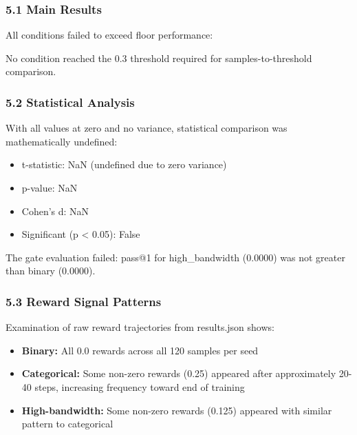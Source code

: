 
\subsubsection{5.1 Main Results}

All conditions failed to exceed floor performance:

\begin{table}[htbp]
\centering
{}
\end{table}

No condition reached the 0.3 threshold required for samples-to-threshold comparison.

\subsubsection{5.2 Statistical Analysis}

With all values at zero and no variance, statistical comparison was mathematically undefined:

\begin{itemize}
\item t-statistic: NaN (undefined due to zero variance)
\item p-value: NaN
\item Cohen's d: NaN
\item Significant (p < 0.05): False
\end{itemize}

The gate evaluation failed: pass@1 for high\_bandwidth (0.0000) was not greater than binary (0.0000).

\subsubsection{5.3 Reward Signal Patterns}

Examination of raw reward trajectories from results.json shows:
\begin{itemize}
\item \textbf{Binary:} All 0.0 rewards across all 120 samples per seed
\item \textbf{Categorical:} Some non-zero rewards (0.25) appeared after approximately 20-40 steps, increasing frequency toward end of training
\item \textbf{High-bandwidth:} Some non-zero rewards (0.125) appeared with similar pattern to categorical
\end{itemize}

